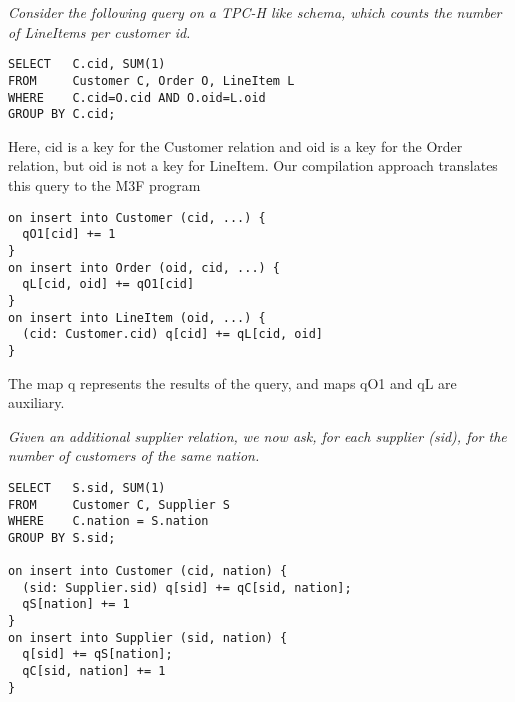 \begin{example}\em
\label{ex:TPCH-Q12}
Consider the following query on a TPC-H like schema,
which counts the number of LineItems per customer id.
\begin{verbatim}
SELECT   C.cid, SUM(1)
FROM     Customer C, Order O, LineItem L
WHERE    C.cid=O.cid AND O.oid=L.oid
GROUP BY C.cid;
\end{verbatim}
Here, cid is a key for the Customer relation and oid is a key for the
Order relation, but oid is not a key for LineItem.
Our compilation approach translates this query to the M3F program
\begin{verbatim}
on insert into Customer (cid, ...) {
  qO1[cid] += 1
}
on insert into Order (oid, cid, ...) {
  qL[cid, oid] += qO1[cid]
}
on insert into LineItem (oid, ...) {
  (cid: Customer.cid) q[cid] += qL[cid, oid]
}
\end{verbatim}
The map q represents the results of the query, and maps qO1 and qL are
auxiliary.
\punto
\end{example}


\begin{example}\em
Given an additional supplier relation, we now ask, for each supplier (sid),
for the number of customers of the same nation.
\begin{verbatim}
SELECT   S.sid, SUM(1)
FROM     Customer C, Supplier S
WHERE    C.nation = S.nation
GROUP BY S.sid;

on insert into Customer (cid, nation) {
  (sid: Supplier.sid) q[sid] += qC[sid, nation];
  qS[nation] += 1
}
on insert into Supplier (sid, nation) {
  q[sid] += qS[nation];
  qC[sid, nation] += 1
}
\end{verbatim}
\end{example}


